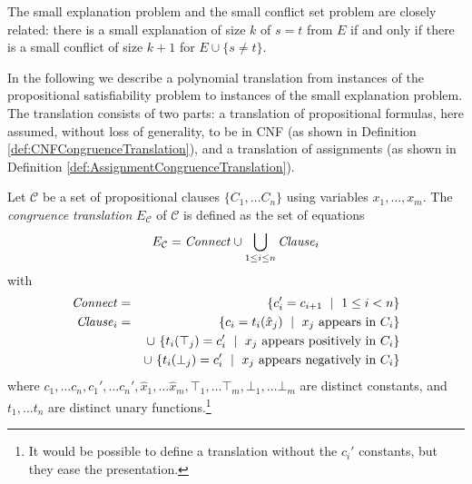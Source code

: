 \documentclass[smallextended]{svjour3}
\begin{document}
\noindent The small explanation problem and the small conflict set
problem are closely related: there is a small explanation of size $k$ of $s=t$
from $E$ if and only if there is a small conflict of size $k+1$ for $E \cup
\{s\neq t\}$.  

\newcommand{\Assignment}{{\it Assignment}}
\newcommand{\Clause}{{\it Clause}}
\newcommand{\Connect}{{\it Connect}}

In the following we describe a polynomial translation from instances of the propositional satisfiability problem to instances of the small explanation problem.
The translation consists of two
parts: a translation of propositional formulas, here assumed, without loss
of generality, to be in CNF (as shown in Definition \ref{def:CNFCongruenceTranslation}), and a translation of assignments (as shown in Definition \ref{def:AssignmentCongruenceTranslation}).


\begin{definition}
\label{def:CNFCongruenceTranslation}
Let $\mathcal{C}$ be a set of propositional clauses $\{C_1,\ldots C_n\}$ using variables $x_1,\ldots,x_m$.
The \emph{congruence translation} $E_{\mathcal{C}}$ of\/ $\mathcal{C}$ is defined as the set of equations
\begin{equation*}
E_{\mathcal{C}} = \Connect \cup \bigcup_{1 \leq i \leq n}\Clause_i 
\end{equation*}
with
\begin{eqnarray*}
	\Connect &=& \{ c_{i}' = c_{i+1} \ \mid\ 1 \leq i < n\}\\
        \Clause_i &=& \{ c_i = t_i(\hat{x}_j) \ \mid\ x_j \text{ appears in } C_i \}\\
           & & \cup\ \{ t_i(\top_j) = c_i' \ \mid\ x_j \text{ appears positively in } C_i \}\\
           & & \cup\ \{ t_i(\bot_j) = c_i' \ \mid\ x_j \text{ appears negatively in } C_i \}
\end{eqnarray*}
where $c_{1},\dots c_{n},c_{1}', \dots c_{n}',
\hat{x}_1, \dots \hat{x}_m, \top_1, \dots \top_m, \bot_1, \dots \bot_m$ are distinct constants, and $t_1, \dots t_n$ are
distinct unary functions.\footnote{It would be possible to define a translation without the $c_i'$ constants, but they ease the presentation.}
\end{definition}
\end{document}
